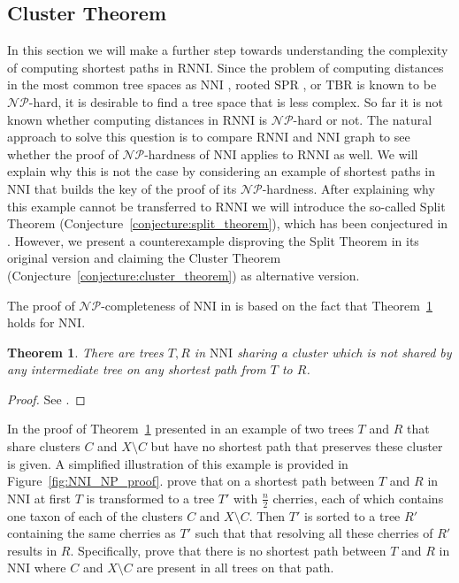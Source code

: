 \documentclass{amsart}
\newcommand{\np}{\mathcal{NP}}
\newcommand{\nni}{\mathrm{NNI}}
\newcommand{\rnni}{\mathrm{RNNI}}
\newcommand{\tbr}{\mathrm{TBR}}
\newcommand{\spr}{\mathrm{SPR}}
\newtheorem{theorem}[definition]{Theorem}
\begin{document}
\subsection{Cluster Theorem}
\label{section:cluster_theorem}

In this section we will make a further step towards understanding the complexity of computing shortest paths in $\rnni$.
Since the problem of computing distances in the most common tree spaces as $\nni$ \autocite{Dasgupta2000-xa}, rooted $\spr$ \autocite{Bordewich2005-nx}, or $\tbr$ \autocite{Allen2001-ky} is known to be $\np$-hard, it is desirable to find a tree space that is less complex.
So far it is not known whether computing distances in $\rnni$ is $\np$-hard or not.
The natural approach to solve this question is to compare $\rnni$ and $\nni$ graph to see whether the proof of $\np$-hardness of $\nni$ applies to $\rnni$ as well.
We will explain why this is not the case by considering an example of shortest paths in $\nni$ that builds the key of the proof of its $\np$-hardness.
After explaining why this example cannot be transferred to $\rnni$ we will introduce the so-called Split Theorem (Conjecture~\ref{conjecture:split_theorem}), which has been conjectured in \autocite{Gavryushkin2018-ol}.
However, we present a counterexample disproving the Split Theorem in its original version and claiming the Cluster Theorem (Conjecture~\ref{conjecture:cluster_theorem}) as alternative version.

The proof of $\np$-completeness of $\nni$ in \autocite{Dasgupta2000-xa} is based on the fact that Theorem~\ref{thm:split_nni} holds for $\nni$.

\begin{theorem}
There are trees $T,R$ in $\nni$ sharing a cluster which is not shared by any intermediate tree on any shortest path from $T$ to $R$.
\label{thm:split_nni}
\end{theorem}

\begin{proof}
See \autocite{Li1996-zw}.
\end{proof}

In the proof of Theorem~\ref{thm:split_nni} presented in \autocite{Li1996-zw} an example of two trees $T$ and $R$ that share clusters $C$ and $X \setminus C$ but have no shortest path that preserves these cluster is given.
A simplified illustration of this example is provided in Figure~\ref{fig:NNI_NP_proof}.
\autocite{Li1996-zw} prove that on a shortest path between $T$ and $R$ in $\nni$ at first $T$ is transformed to a tree $T'$ with $\frac{n}{2}$ cherries, each of which contains one taxon of each of the clusters $C$ and $X \setminus C$.
Then $T'$ is sorted to a tree $R'$ containing the same cherries as $T'$ such that that resolving all these cherries of $R'$ results in $R$.
Specifically, \autocite{Li1996-zw} prove that there is no shortest path between $T$ and $R$ in $\nni$ where $C$ and $X \setminus C$ are present in all trees on that path.
\end{document}
